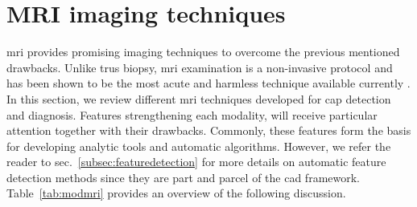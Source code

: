 \section{MRI imaging techniques}\label{sec:chp2:imaging}

\ac{mri} provides promising imaging techniques to overcome the previous mentioned drawbacks.
Unlike \ac{trus} biopsy, \ac{mri} examination is a non-invasive protocol and has been shown to be the most acute and harmless technique available currently \cite{Turkbey2012}.
In this section, we review different \ac{mri} techniques developed for \ac{cap} detection and diagnosis.
Features strengthening each modality, will receive particular attention together with their drawbacks.
Commonly, these features form the basis for developing analytic tools and automatic algorithms.
However, we refer the reader to \acs{sec}.~\ref{subsec:featuredetection} for more details on automatic feature detection methods since they are part and parcel of the \acs{cad} framework.
Table~\ref{tab:modmri} provides an overview of the following discussion.

